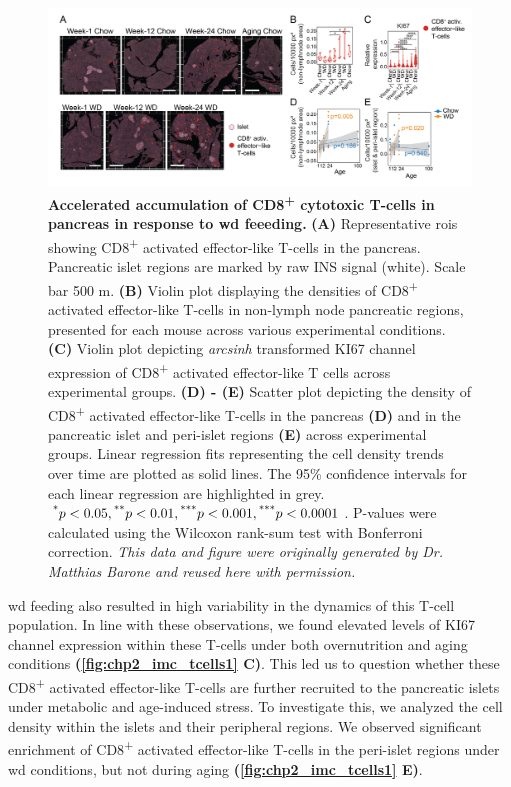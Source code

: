 \begin{figure}[b!]
\centering
\includegraphics[width=\linewidth]{Chapter4/Fig/F2-10-02.png}
\caption[Accelerated accumulation of CD8\textsuperscript{+} cytotoxic T-cells in pancreas]{\textbf{Accelerated accumulation of CD8\textsuperscript{+} cytotoxic T-cells in pancreas in response to \gls{wd} feeeding.} \textbf{(A)} Representative \glspl{roi} showing CD8\textsuperscript{+} activated effector-like T-cells in the pancreas. Pancreatic islet regions are marked by raw INS signal (white).  Scale bar 500 \textmu m. \textbf{(B)} Violin plot displaying the densities of CD8\textsuperscript{+} activated effector-like T-cells in non-lymph node pancreatic regions, presented for each mouse across various experimental conditions. \textbf{(C)} Violin plot depicting \textit{arcsinh} transformed KI67 channel expression of CD8\textsuperscript{+} activated effector-like T cells across experimental groups. \textbf{(D) - (E)} Scatter plot depicting the density of CD8\textsuperscript{+} activated effector-like T-cells in the pancreas \textbf{(D)} and in the pancreatic islet and peri-islet regions \textbf{(E)} across experimental groups. Linear regression fits representing the cell density trends over time are plotted as solid lines. The 95\% confidence intervals for each linear regression are highlighted in grey. $\textsuperscript{*} p < 0.05, \textsuperscript{**} p < 0.01, \textsuperscript{***} p < 0.001, \textsuperscript{***} p < 0.0001$. P-values were calculated using the Wilcoxon rank-sum test with Bonferroni correction. \textit{This data and figure were originally generated by Dr. Matthias Barone and reused here with permission.}}
\label{fig:chp2_imc_tcells1}
\end{figure}

\clearpage

\gls{wd} feeding also resulted in high variability in the dynamics of this T-cell population. In line with these observations, we found elevated levels of KI67 channel expression within these T-cells under both overnutrition and aging conditions \textbf{(\autoref{fig:chp2_imc_tcells1} C)}. This led us to question whether these CD8\textsuperscript{+} activated effector-like T-cells are further recruited to the pancreatic islets under metabolic and age-induced stress. To investigate this, we analyzed the cell density within the islets and their peripheral regions. We observed significant enrichment of CD8\textsuperscript{+} activated effector-like T-cells in the peri-islet regions under \gls{wd} conditions, but not during aging \textbf{(\autoref{fig:chp2_imc_tcells1} E)}.\\


